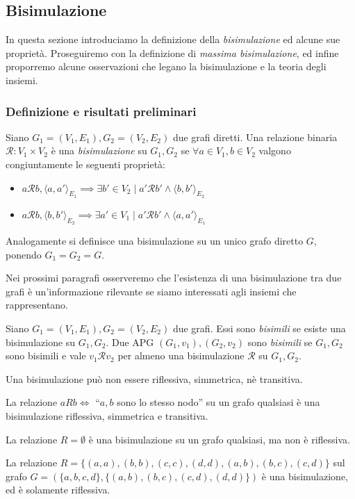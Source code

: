 \subsection{Bisimulazione}
In questa sezione introduciamo la definizione della \emph{bisimulazione} ed alcune sue proprietà. Proseguiremo con la definizione di \emph{massima bisimulazione}, ed infine proporremo alcune osservazioni che legano la bisimulazione e la teoria degli insiemi.

\subsubsection{Definizione e risultati preliminari}
\begin{definition}
    Siano $G_1 = (V_1,E_1), G_2 = (V_2,E_2)$ due grafi diretti. Una relazione binaria $\mathcal{R}: V_1 \times V_2$ è una \emph{bisimulazione} su $G_1, G_2$ se $\forall a \in V_1, b \in V_2$ valgono congiuntamente le seguenti proprietà:
    \begin{itemize}
        \item $a \mathcal{R} b, \langle a, a' \rangle_{E_1} \implies \exists b' \in V_2 \mid a' \mathcal{R} b' \land \langle b, b' \rangle_{E_2}$
        \item $a \mathcal{R} b, \langle b, b' \rangle_{E_2} \implies \exists a' \in V_1 \mid a' \mathcal{R} b' \land \langle a, a' \rangle_{E_1}$
    \end{itemize}
    Analogamente si definisce una bisimulazione su un unico grafo diretto $G$, ponendo $G_1 = G_2 = G$.
\end{definition}

Nei prossimi paragrafi osserveremo che l'esistenza di una bisimulazione tra due grafi è un'informazione rilevante se siamo interessati agli insiemi che rappresentano.
\begin{definition}
    Siano $G_1 = (V_1,E_1), G_2 = (V_2,E_2)$ due grafi. Essi sono \emph{bisimili} se esiste una bisimulazione su $G_1, G_2$.
    Due APG $(G_1, v_1), (G_2, v_2)$ sono \emph{bisimili} se $G_1, G_2$ sono bisimili e vale $v_1 \mathcal{R} v_2$ per almeno una bisimulazione $\mathcal{R}$ su $G_1, G_2$.
\end{definition}

\begin{observation}
    Una bisimulazione può non essere riflessiva, simmetrica, nè transitiva.
\end{observation}

\begin{example}
    La relazione $a R b \iff$ ``$a,b$ sono lo stesso nodo'' su un grafo qualsiasi è una bisimulazione riflessiva, simmetrica e transitiva.

    La relazione $R = \emptyset$ è una bisimulazione su un grafo qualsiasi, ma non è riflessiva.

    La relazione $R = \{(a,a),(b,b),(c,c),(d,d),(a,b),(b,c),(c,d)\}$ sul grafo $G = (\{a,b,c,d\}, \{(a,b),(b,c),(c,d),(d,d)\})$ è una bisimulazione, ed è solamente riflessiva.
\end{example}

